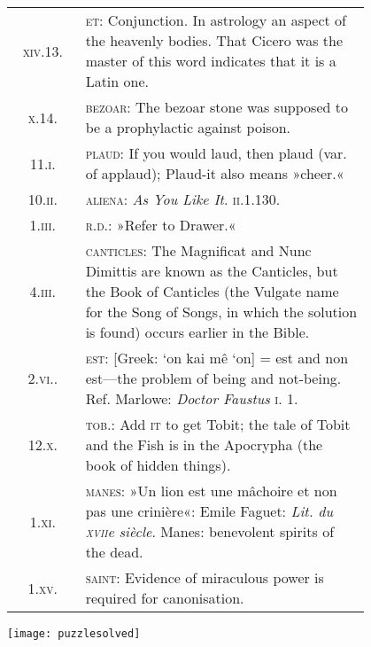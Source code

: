 \begin{longtable} {c p{0.8\linewidth}}
\textsc{xiv.13.} & \textsc{et}: Conjunction. In astrology an aspect of the heavenly bodies. That Cicero was the master of this word indicates that it is a Latin one.\\

\textsc{x.14.} & \textsc{bezoar}: The bezoar stone was supposed to be a prophylactic against poison.\\

\textsc{11.i.} & \textsc{plaud}: If you would laud, then plaud (var. of applaud); Plaud-it also means »cheer.«\\

\textsc{10.ii.} &  \textsc{aliena}: \textit{As You Like It}. \textsc{ii}.1.130.\\

\textsc{1.iii.} &  \textsc{r.d.}: »Refer to Drawer.«\\

\textsc{4.iii.} &  \textsc{canticles}: The Magnificat and Nunc Dimittis are known as the Canticles, but the Book of Canticles (the Vulgate name for the Song of Songs, in which the solution is found) occurs earlier in the Bible.\\

\textsc{2.vi.}. &  \textsc{est}: [Greek: `on kai mê `on] = est and non est—the problem of being and not-being. Ref. Marlowe: \textit{Doctor Faustus} \textsc{i. 1.}\\

\textsc{12.x.} &  \textsc{tob}.: Add \textsc{it} to get Tobit; the tale of Tobit and the Fish is in the Apocrypha (the book of hidden things).\\

\textsc{1.xi.} &  \textsc{manes}: »Un lion est une mâchoire et non pas une crinière«: Emile Faguet: \textit{Lit. du \textsc{xvii}e siècle}. Manes: benevolent spirits of the dead.\\

\textsc{1.xv}. &  \textsc{saint}: Evidence of miraculous power is required for canonisation.\\
\end{longtable}

\texttt{[image: puzzlesolved]}